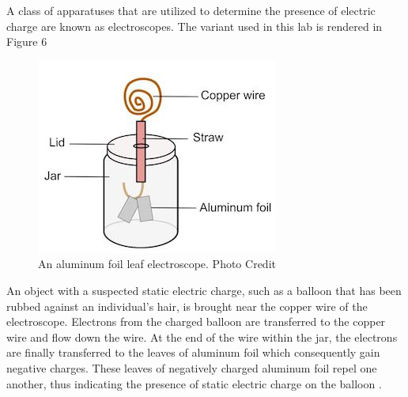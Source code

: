 \documentclass[oneside,12pt]{amsart}
\begin{document}
\indent A class of  apparatuses that are utilized to determine the presence of electric charge are known as electroscopes. The variant used in this lab is rendered in Figure 6\\
\begin{figure}[h]
	\includegraphics[width=\smallgraph,scale=0.01]{leaf.png}
	\caption{An aluminum foil leaf electroscope. Photo Credit \cite{Ele}}
	\label{leaf}
\end{figure} 

\indent An object with a suspected static electric charge, such as a balloon that has been rubbed against an individual’s hair, is brought near the copper wire of the electroscope. Electrons from the charged balloon are transferred to the copper wire and flow down the wire. At the end of the wire within the jar, the electrons are finally transferred to the leaves of aluminum foil which consequently gain negative charges. These leaves of negatively charged aluminum foil repel one another, thus indicating the presence of static electric charge on the balloon \cite{Champ}. \\
\end{document}
